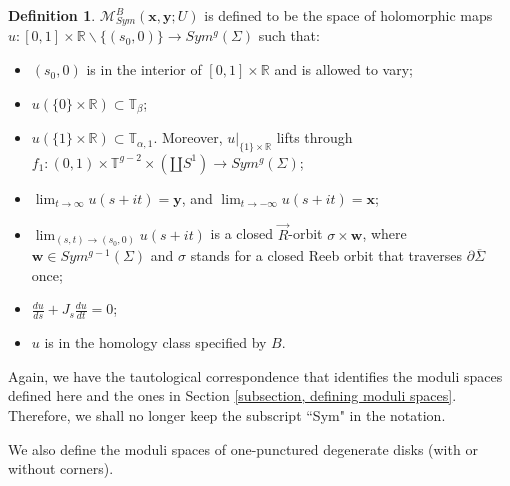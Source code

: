 \documentclass{amsart}
\theoremstyle{definition}
\newtheorem{defn}[thm]{Definition}
\theoremstyle{remark}
\numberwithin{equation}{section}
\numberwithin{equation}{section} \makeatletter
\begin{document}
\begin{defn}
${\mathcal{M}}^B_{Sym}(\bm{x},\bm{y};U)$ is defined to be the space of holomorphic maps $u:[0,1]\times\mathbb{R}\backslash \{(s_0,0)\}\rightarrow Sym^g(\Sigma)$ such that:
\begin{itemize}
\item[(1)]$(s_0,0)$ is in the interior of $[0,1]\times\mathbb{R}$ and is allowed to vary;
\item[(2)]$u(\{0\}\times \mathbb{R})\subset \mathbb{T}_\beta$;
\item[(3)]$u(\{1\}\times \mathbb{R})\subset \mathbb{T}_{\alpha,1}$. Moreover, $u|_{\{1\}\times \mathbb{R}}$ lifts through $f_1:(0,1)\times\mathbb{T}^{g-2}\times (\amalg S^1)\rightarrow Sym^g(\Sigma)$;
\item[(4)]$\lim_{t\rightarrow\infty}u(s+it)=\bm{y}$, and $\lim_{t\rightarrow -\infty}u(s+it)=\bm{x}$;
\item[(5)]$\lim_{(s,t)\rightarrow (s_0,0)}u(s+it)$ is a closed $\overrightarrow{R}$-orbit $\sigma \times \bm{w}$, where $\bm{w}\in Sym^{g-1}(\Sigma)$ and $\sigma$ stands for a closed Reeb orbit that traverses $\partial \overline{\Sigma}$ once;
\item[(6)]$\frac{du}{ds}+J_s\frac{du}{dt}=0$;
\item[(7)]$u$ is in the homology class specified by $B$.
\end{itemize}
\end{defn}
Again, we have the tautological correspondence that identifies the moduli spaces defined here and the ones in Section \ref{subsection, defining moduli spaces}. Therefore, we shall no longer keep the subscript ``Sym" in the notation. 

We also define the moduli spaces of one-punctured degenerate disks (with or without corners).  
\end{document}

